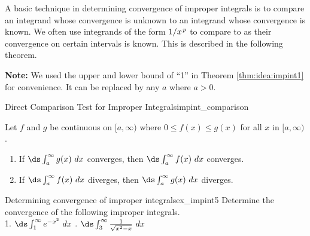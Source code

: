 %
A basic technique in determining convergence of improper integrals is to compare an integrand whose convergence is unknown to an integrand whose convergence is known. We often use integrands of the form $1/x\hskip1pt ^p$ to compare to as their convergence on certain intervals is known. This is described in the following theorem.

{\textbf{Note:} We used the upper and lower bound of ``1'' in Theorem \ref{thm:idea:impint1} for convenience. It can be replaced by any $a$ where $a>0$. 
}


\begin{theorem}{Direct Comparison Test for Improper Integrals}{impint_comparison}
{		
Let $f$ and $g$ be continuous on $[a,\infty)$ where $0\leq f(x)\leq g(x)$ for all $x$ in $[a,\infty)$. 
	\begin{enumerate}
	\item		If $\ds \int_a^\infty g(x)\ dx$ converges, then $\ds \int_a^\infty f(x)\ dx$ converges.
	\item		If $\ds \int_a^\infty f(x)\ dx$ diverges, then $\ds \int_a^\infty g(x)\ dx$ diverges.
	\end{enumerate}
	}
\end{theorem}


\begin{example}{Determining convergence of improper integrals}{ex_impint5}{
Determine the convergence of the following improper integrals.\\
1. $\ds \int_1^\infty e^{-x^2}\ dx$ \qquad{}. $\ds \int_3^\infty \frac{1}{\sqrt{x^2-x}}\ dx$
}
\end{example}


